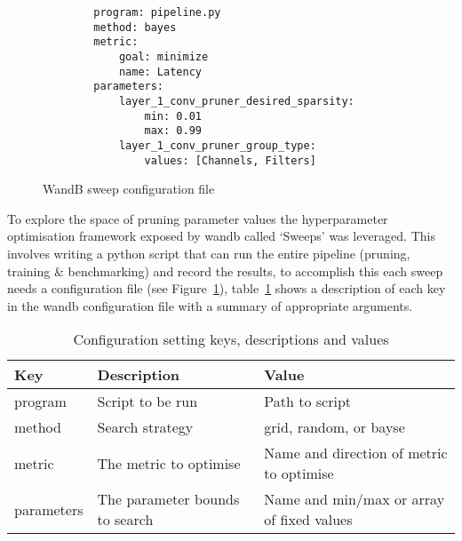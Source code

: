 \documentclass[../Dissertation.tex]{subfiles}
\begin{document}
\singlespacing
\begin{figure}[H]
    \begin{verbatim}
        program: pipeline.py
        method: bayes
        metric:
            goal: minimize
            name: Latency
        parameters:
            layer_1_conv_pruner_desired_sparsity:
                min: 0.01
                max: 0.99
            layer_1_conv_pruner_group_type:
                values: [Channels, Filters]
    \end{verbatim}
    \caption{WandB sweep configuration file}
    \label{fig:sweepConfig}
\end{figure}
\doublespacing

To explore the space of pruning parameter values the hyperparameter optimisation framework exposed by \acrshort{wandb} called `Sweeps' was leveraged. 
This involves writing a python script that can run the entire pipeline (pruning, training \& benchmarking) and record the results, to accomplish this each sweep needs a configuration file (see Figure~\ref{fig:sweepConfig}), table~\ref{tab:WandBConfig} shows a description of each key in the \acrshort{wandb} configuration file with a summary of appropriate arguments. 



\begin{table}[H]
    \begin{tabular}{@{}|l|l|l|@{}}
    \toprule
    Key        & Description                    & Value                                    \\ \midrule
    program    & Script to be run               & Path to script                           \\ \midrule
    method     & Search strategy                & grid, random, or bayse                   \\ \midrule
    metric     & The metric to optimise         & Name and direction of metric to optimise \\ \midrule
    parameters & The parameter bounds to search & Name and min/max or array of fixed values  \\ \bottomrule
    \end{tabular}
    \caption{Configuration setting keys, descriptions and values}
    \label{tab:WandBConfig}
\end{table}


\end{document}
